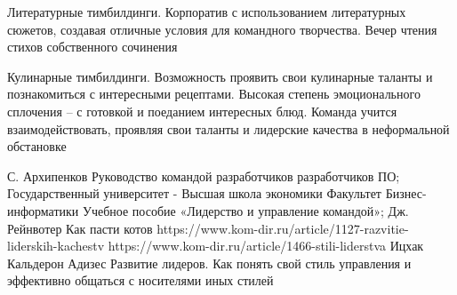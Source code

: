 \documentclass{../industrial-development}
\begin{document}
Литературные тимбилдинги. Корпоратив с использованием литературных сюжетов, создавая отличные условия для командного творчества. Вечер чтения стихов собственного сочинения

Кулинарные тимбилдинги. Возможность проявить свои кулинарные таланты и познакомиться с интересными рецептами. Высокая степень эмоционального сплочения – с готовкой и поеданием интересных блюд. Команда учится взаимодействовать, проявляя свои таланты и лидерские качества в неформальной обстановке


\begin{thebibliography}{99}


С. Архипенков Руководство командой разработчиков разработчиков ПО;
Государственный университет  - Высшая школа экономики Факультет Бизнес-информатики Учебное пособие «Лидерство и управление командой»;
Дж. Рейнвотер Как пасти котов 
https://www.kom-dir.ru/article/1127-razvitie-liderskih-kachestv
https://www.kom-dir.ru/article/1466-stili-liderstva
Ицхак Кальдерон Адизес Развитие лидеров. Как понять свой стиль управления и эффективно общаться с носителями иных стилей
\end{thebibliography}
\end{document}
